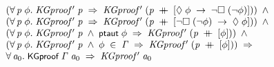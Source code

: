 \documentclass{report}
\renewcommand{\HOLConst}[1]{{\textsf{\upshape\small #1}}}
\newenvironment{holmath}{\begin{displaymath}\begin{array}{l}}{\end{array}\end{displaymath}\ignorespacesafterend}
\begin{document}
\begin{holmath}
\;\;\;\;\;(\HOLSymConst{\HOLTokenForall{}}\HOLBoundVar{p}\;\HOLBoundVar{\ensuremath{\phi}}.\;\HOLFreeVar{KGproof\sp{\prime}}\;\HOLBoundVar{p}\;\HOLSymConst{\HOLTokenImp{}}\;\HOLFreeVar{KGproof\sp{\prime}}\;(\HOLBoundVar{p}\;\HOLSymConst{\HOLTokenDoublePlus}\;[\HOLSymConst{\ensuremath{\Diamond}}\;\HOLBoundVar{\ensuremath{\phi}}\;\HOLSymConst{\ensuremath{\rightarrow}}\;\HOLSymConst{\HOLTokenNeg{}}\HOLSymConst{\ensuremath{\Box}}\;(\HOLSymConst{\HOLTokenNeg{}}\HOLBoundVar{\ensuremath{\phi}})]))\;\HOLSymConst{\HOLTokenConj{}}\\
\;\;\;\;\;(\HOLSymConst{\HOLTokenForall{}}\HOLBoundVar{p}\;\HOLBoundVar{\ensuremath{\phi}}.\;\HOLFreeVar{KGproof\sp{\prime}}\;\HOLBoundVar{p}\;\HOLSymConst{\HOLTokenImp{}}\;\HOLFreeVar{KGproof\sp{\prime}}\;(\HOLBoundVar{p}\;\HOLSymConst{\HOLTokenDoublePlus}\;[\HOLSymConst{\HOLTokenNeg{}}\HOLSymConst{\ensuremath{\Box}}\;(\HOLSymConst{\HOLTokenNeg{}}\HOLBoundVar{\ensuremath{\phi}})\;\HOLSymConst{\ensuremath{\rightarrow}}\;\HOLSymConst{\ensuremath{\Diamond}}\;\HOLBoundVar{\ensuremath{\phi}}]))\;\HOLSymConst{\HOLTokenConj{}}\\
\;\;\;\;\;(\HOLSymConst{\HOLTokenForall{}}\HOLBoundVar{p}\;\HOLBoundVar{\ensuremath{\phi}}.\;\HOLFreeVar{KGproof\sp{\prime}}\;\HOLBoundVar{p}\;\HOLSymConst{\HOLTokenConj{}}\;\HOLConst{ptaut}\;\HOLBoundVar{\ensuremath{\phi}}\;\HOLSymConst{\HOLTokenImp{}}\;\HOLFreeVar{KGproof\sp{\prime}}\;(\HOLBoundVar{p}\;\HOLSymConst{\HOLTokenDoublePlus}\;[\HOLBoundVar{\ensuremath{\phi}}]))\;\HOLSymConst{\HOLTokenConj{}}\\
\;\;\;\;\;(\HOLSymConst{\HOLTokenForall{}}\HOLBoundVar{p}\;\HOLBoundVar{\ensuremath{\phi}}.\;\HOLFreeVar{KGproof\sp{\prime}}\;\HOLBoundVar{p}\;\HOLSymConst{\HOLTokenConj{}}\;\HOLBoundVar{\ensuremath{\phi}}\;\HOLSymConst{\HOLTokenIn{}}\;\HOLFreeVar{\ensuremath{\Gamma}}\;\HOLSymConst{\HOLTokenImp{}}\;\HOLFreeVar{KGproof\sp{\prime}}\;(\HOLBoundVar{p}\;\HOLSymConst{\HOLTokenDoublePlus}\;[\HOLBoundVar{\ensuremath{\phi}}]))\;\HOLSymConst{\HOLTokenImp{}}\\
\;\;\;\;\;\HOLSymConst{\HOLTokenForall{}}\HOLBoundVar{a\sb{\mathrm{0}}}.\;\HOLConst{KGproof}\;\HOLFreeVar{\ensuremath{\Gamma}}\;\HOLBoundVar{a\sb{\mathrm{0}}}\;\HOLSymConst{\HOLTokenImp{}}\;\HOLFreeVar{KGproof\sp{\prime}}\;\HOLBoundVar{a\sb{\mathrm{0}}}
\end{holmath}
\end{document}
